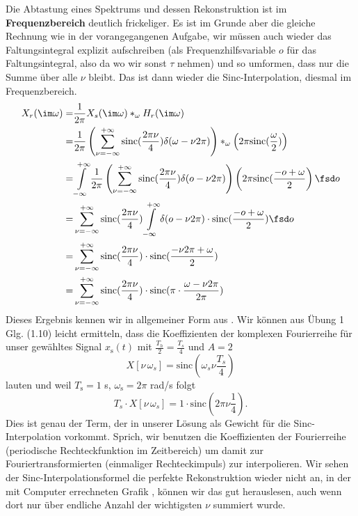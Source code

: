 \begin{Loesung}
Die Abtastung eines Spektrums und dessen Rekonstruktion ist im
\textbf{Frequenzbereich} deutlich frickeliger.
Es ist im Grunde aber die gleiche Rechnung wie in der vorangegangenen Aufgabe,
wir müssen auch wieder das Faltungsintegral explizit aufschreiben (als
Frequenzhilfsvariable $o$ für das Faltungsintegral, also da wo wir sonst $\tau$ nehmen)
und so umformen, dass
nur die Summe über alle $\nu$ bleibt. Das ist dann wieder die Sinc-Interpolation,
diesmal im Frequenzbereich.
\begin{align}
X_r(\im\omega) =& \frac{1}{2\pi} X_s(\im\omega) \ast_\omega H_r(\im\omega)\\
=&\frac{1}{2\pi}
\left(\sum_{\nu=-\infty}^{+\infty} \mathrm{sinc}(\frac{2\pi\nu}{4}) \delta(\omega-\nu 2 \pi)\right)
\ast_\omega
\left(2\pi\mathrm{sinc}(\frac{\omega}{2})\right)\\
=&\int\limits_{-\infty}^{+\infty}
\frac{1}{2\pi}
\left(\sum_{\nu=-\infty}^{+\infty} \mathrm{sinc}(\frac{2\pi\nu}{4}) \delta(o-\nu 2 \pi)\right)
\left(2\pi\mathrm{sinc}(\frac{-o+\omega}{2}\right)
\fsd o\\
=&
\sum_{\nu=-\infty}^{+\infty} \mathrm{sinc}(\frac{2\pi\nu}{4})
\int\limits_{-\infty}^{+\infty}
\delta(o-\nu 2 \pi)\cdot
\mathrm{sinc}(\frac{-o+\omega}{2})
\fsd o\\
=&
\sum_{\nu=-\infty}^{+\infty} \mathrm{sinc}(\frac{2\pi\nu}{4})\cdot
\mathrm{sinc}(\frac{-\nu 2 \pi+\omega}{2})\\
=&
\sum_{\nu=-\infty}^{+\infty} \mathrm{sinc}(\frac{2\pi\nu}{4})\cdot
\mathrm{sinc}(\pi\cdot\frac{\omega-\nu 2 \pi}{2\pi})
\end{align}
Dieses Ergebnis kennen wir in allgemeiner Form aus .
%
Wir können aus Übung 1 Glg. (1.10) leicht ermitteln, dass die Koeffizienten
der komplexen Fourierreihe für unser gewähltes Signal $x_\mathrm{s}(t)$ mit
$\frac{T_h}{2} = \frac{T_s}{4}$ und $A=2$
\begin{equation}
X[\nu\,\omega_s] = \mathrm{sinc}(\omega_s \nu \frac{T_s}{4})
\end{equation}
lauten und weil $T_\mathrm{s}=1$ s, $\omega_\mathrm{s}=2\pi$ rad/s folgt
\begin{equation}
T_s \cdot X[\nu\,\omega_s] = 1 \cdot \mathrm{sinc}(2\pi \nu \frac{1}{4}).
\end{equation}
Dies ist genau der Term, der in unserer Lösung als Gewicht für die Sinc-Interpolation
vorkommt. Sprich, wir benutzen die Koeffizienten der Fourierreihe
(periodische Rechteckfunktion im Zeitbereich) um damit
zur Fouriertransformierten (einmaliger Rechteckimpuls) zur interpolieren.
Wir sehen der Sinc-Interpolationsformel die perfekte Rekonstruktion wieder nicht an,
in der mit Computer errechneten Grafik ,
können wir das gut herauslesen, auch wenn dort nur über endliche Anzahl der
wichtigsten $\nu$ summiert wurde.


\end{Loesung}
